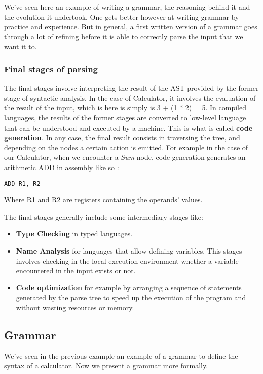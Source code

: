 \documentclass[12pt]{article}
\begin{document}
We’ve seen here an example of writing a grammar, the reasoning behind it and the evolution it undertook. One gets better however at writing grammar by practice and experience. But in general, a first written version of a grammar goes through a lot of refining before it is able to correctly parse the input that we want it to.

\subsubsection{Final stages of parsing}
The final stages involve interpreting the result of the AST provided by the former stage of syntactic analysis. In the case of Calculator, it involves the evaluation of the result of the input, which is here is simply is 3 + (1 * 2) = 5. In compiled languages, the results of the former stages are converted to low-level language that can be understood and executed by a machine. This is what is called \textbf{code generation}. In any case, the final result consists in traversing the tree, and depending on the nodes a certain action is emitted. For example in the case of our Calculator, when we encounter a \emph{Sum} node, code generation generates an arithmetic ADD in assembly like so :
\begin{lstlisting}
ADD R1, R2
\end{lstlisting}
Where R1 and R2 are registers containing the operands’ values.

The final stages generally include some intermediary stages like:
\begin{itemize}
    \item \textbf{Type Checking} in typed languages.
    \item \textbf{Name Analysis} for languages that allow defining variables. This stages involves checking in the local execution environment whether a variable encountered in the input exists or not.
    \item \textbf{Code optimization} for example by arranging a sequence of statements generated by the parse tree to speed up the execution of the program and without wasting resources or memory.
\end{itemize}

\pagebreak

\subsection{Grammar}
We’ve seen in the previous example an example of a grammar to define the syntax of a calculator. Now we present a grammar more formally.
\end{document}

